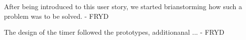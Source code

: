 After being introduced to this user story, we started brianstorming how such a problem was to be solved.
 - FRYD
 
 The design of the timer followed the prototypes, additionanal ...
 - FRYD